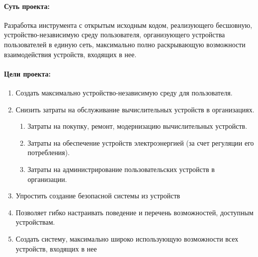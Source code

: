 \paragraph*{Суть проекта:}
Разработка инструмента с открытым исходным кодом, реализующего бесшовную, устройство-независимую среду пользователя, организующего устройства пользователей в единую сеть, максимально полно раскрывающую возможности взаимодействия устройств, входящих в нее.

\paragraph*{Цели проекта:}
\begin{enumerate}
   \item Создать максимально устройство-независимую среду для пользователя.
   \item Снизить затраты на обслуживание вычислительных устройств в организациях.
         \begin{enumerate}[nosep,label*={\arabic*.}]
            \item Затраты на покупку, ремонт, модернизацию вычислительных устройств.
            \item Затраты на обеспечение устройств электроэнергией (за счет регуляции его потребления).
            \item Затраты на администрирование пользовательских устройств в организации.
         \end{enumerate}
   \item Упростить создание безопасной системы из устройств
   \item Позволяет гибко настраивать поведение и перечень возможностей, доступным устройствам.
   \item Создать систему, максимально широко использующую возможности всех устройств, входящих в нее
\end{enumerate}

